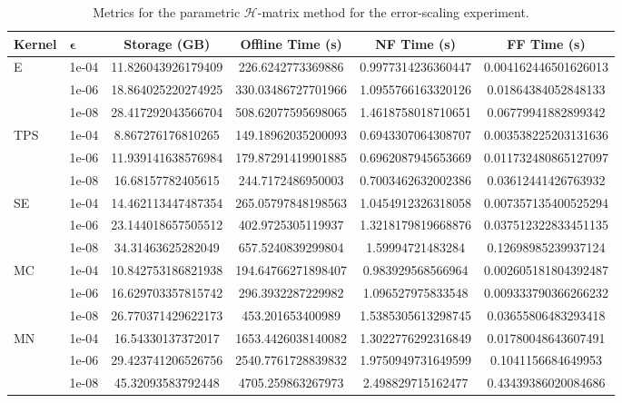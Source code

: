 \documentclass[final,3p,times]{elsarticle}
\newcommand{\mc}[1]{\mathcal{#1}}
\begin{document}
\begin{table}[!ht]
\centering
\scriptsize
\begin{tabular}{llSSSS }
\hline
\textbf{Kernel} & $\mathbf{\epsilon}$ & \textbf{Storage (GB)} & \textbf{Offline Time (s)} & \textbf{NF Time (s)} & \textbf{FF Time (s)} \\
\hline 
        E & 1e-04 & 11.826043926179409 & 226.6242773369886 & 0.9977314236360447 & 0.004162446501626013 \\ 
         & 1e-06 & 18.864025220274925 & 330.03486727701966 & 1.0955766163320126 & 0.01864384052848133 \\ 
         & 1e-08 & 28.417292043566704 & 508.62077595698065 & 1.4618758018710651 & 0.06779941882899342 \\ \hline
        TPS & 1e-04 & 8.867276176810265 & 149.18962035200093 & 0.6943307064308707 & 0.003538225203131636 \\ 
         & 1e-06 & 11.939141638576984 & 179.87291419901885 & 0.6962087945653669 & 0.011732480865127097 \\ 
         & 1e-08 & 16.68157782405615 & 244.7172486950003 & 0.7003462632002386 & 0.03612441426763932 \\ \hline
        SE & 1e-04 & 14.462113447487354 & 265.05797848198563 & 1.0454912326318058 & 0.007357135400525294 \\ 
         & 1e-06 & 23.144018657505512 & 402.9725305119937 & 1.3218179819668876 & 0.037512322833451135 \\ 
        & 1e-08 & 34.31463625282049 & 657.5240839299804 & 1.59994721483284 & 0.12698985239937124 \\ \hline
        MC & 1e-04 & 10.842753186821938 & 194.64766271898407 & 0.983929568566964 & 0.002605181804392487 \\ 
         & 1e-06 & 16.629703357815742 & 296.3932287229982 & 1.096527975833548 & 0.009333790366266232 \\ 
         & 1e-08 & 26.770371429622173 & 453.201653400989 & 1.5385305613298745 & 0.03655806483293418 \\ \hline
        MN & 1e-04 & 16.54330137372017 & 1653.4426038140082 & 1.3022776292316849 & 0.01780048643607491 \\ 
         & 1e-06 & 29.423741206526756 & 2540.7761728839832 & 1.9750949731649599 & 0.1041156684649953 \\ 
         & 1e-08 & 45.32093583792448 & 4705.259863267973 & 2.498829715162477 & 0.43439386020084686 \\ \hline
\end{tabular}%
\caption{Metrics for the parametric $\mc{H}$-matrix method for the error-scaling experiment.}
\label{tab:ph_matrix_method_err}
\end{table}
\end{document}
